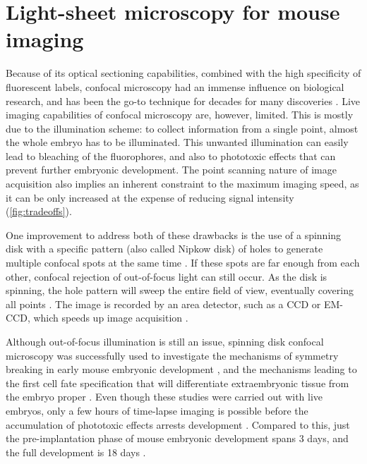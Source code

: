 \section{Light-sheet microscopy for mouse imaging}

  Because of its optical sectioning capabilities, combined with the high specificity of fluorescent labels, confocal microscopy had an immense influence on biological research, and has been the go-to technique for decades for many discoveries \cite{shotton_confocal_1989,graf_live_2005,jonkman_any_2015}.
  Live imaging capabilities of confocal microscopy are, however, limited. This is mostly due to the illumination scheme: to collect information from a single point, almost the whole embryo has to be illuminated. This unwanted illumination can easily lead to bleaching of the fluorophores, and also to phototoxic effects that can prevent further embryonic development. The point scanning nature of image acquisition also implies an inherent constraint to the maximum imaging speed, as it can be only increased at the expense of reducing signal intensity (\autoref{fig:tradeoffs}).

  One improvement to address both of these drawbacks is the use of a spinning disk with a specific pattern (also called Nipkow disk) of holes to generate multiple confocal spots at the same time \cite{graf_live_2005}. If these spots are far enough from each other, confocal rejection of out-of-focus light can still occur. As the disk is spinning, the hole pattern will sweep the entire field of view, eventually covering all points \cite{kino_intermediate_1990}. The image is recorded by an area detector, such as a CCD or EM-CCD, which speeds up image acquisition \cite{nakano_spinning-disk_2002}.

  Although out-of-focus illumination is still an issue, spinning disk confocal microscopy was successfully used to investigate the mechanisms of symmetry breaking in early mouse embryonic development \cite{korotkevich_apical_2017}, and the mechanisms leading to the first cell fate specification that will differentiate extraembryonic tissue from the embryo proper \cite{maitre_pulsatile_2015,dietrich_venus_2015,maitre_asymmetric_2016}. Even though these studies were carried out with live embryos, only a few hours of time-lapse imaging is possible before the accumulation of phototoxic effects arrests development \cite{nowotschin_chapter_2010}. Compared to this, just the pre-implantation phase of mouse embryonic development spans 3 days, and the full development is 18 days \cite{wolpert_principles_2011}.



